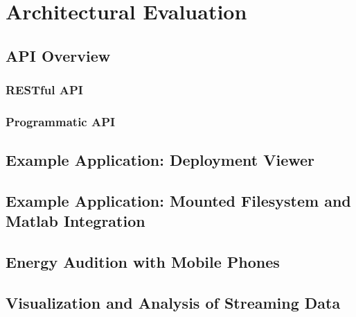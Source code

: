 
\chapter{Architectural Evaluation}

\section{API Overview}
	\subsection{RESTful API}
	\subsection{Programmatic API}
\section{Example Application: Deployment Viewer}
\section{Example Application: Mounted Filesystem and Matlab Integration}


\section{Energy Audition with Mobile Phones}









\section{Visualization and Analysis of Streaming Data}

